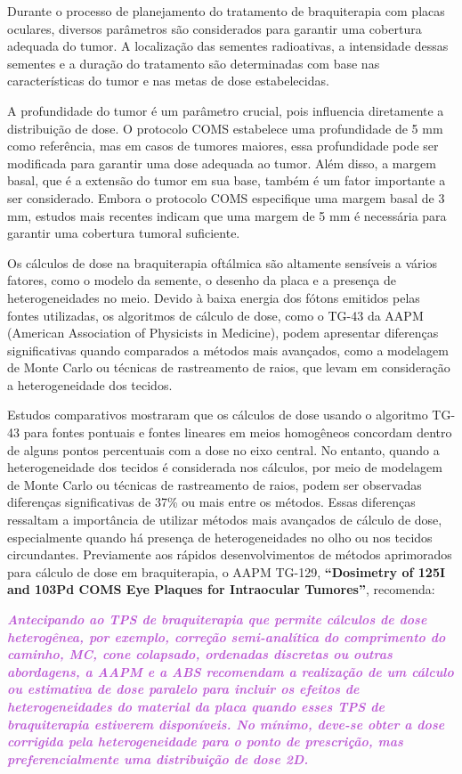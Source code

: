 \documentclass[11pt,a4paper]{article}
\newcounter{exemplo}
\begin{document}
    Durante o processo de planejamento do tratamento de braquiterapia com placas oculares, diversos parâmetros são considerados para garantir uma cobertura adequada do tumor. A localização das sementes radioativas, a intensidade dessas sementes e a duração do tratamento são determinadas com base nas características do tumor e nas metas de dose estabelecidas.

    A profundidade do tumor é um parâmetro crucial, pois influencia diretamente a distribuição de dose. O protocolo COMS estabelece uma profundidade de 5 mm como referência, mas em casos de tumores maiores, essa profundidade pode ser modificada para garantir uma dose adequada ao tumor. Além disso, a margem basal, que é a extensão do tumor em sua base, também é um fator importante a ser considerado. Embora o protocolo COMS especifique uma margem basal de 3 mm, estudos mais recentes indicam que uma margem de 5 mm é necessária para garantir uma cobertura tumoral suficiente.

    Os cálculos de dose na braquiterapia oftálmica são altamente sensíveis a vários fatores, como o modelo da semente, o desenho da placa e a presença de heterogeneidades no meio. Devido à baixa energia dos fótons emitidos pelas fontes utilizadas, os algoritmos de cálculo de dose, como o TG-43 da AAPM (American Association of Physicists in Medicine), podem apresentar diferenças significativas quando comparados a métodos mais avançados, como a modelagem de Monte Carlo ou técnicas de rastreamento de raios, que levam em consideração a heterogeneidade dos tecidos.

    Estudos comparativos mostraram que os cálculos de dose usando o algoritmo TG-43 para fontes pontuais e fontes lineares em meios homogêneos concordam dentro de alguns pontos percentuais com a dose no eixo central. No entanto, quando a heterogeneidade dos tecidos é considerada nos cálculos, por meio de modelagem de Monte Carlo ou técnicas de rastreamento de raios, podem ser observadas diferenças significativas de 37\% ou mais entre os métodos. Essas diferenças ressaltam a importância de utilizar métodos mais avançados de cálculo de dose, especialmente quando há presença de heterogeneidades no olho ou nos tecidos circundantes. Previamente aos rápidos desenvolvimentos de métodos aprimorados para cálculo de dose em braquiterapia, o AAPM TG-129, \textbf{``Dosimetry of 125I and 103Pd COMS Eye Plaques for Intraocular Tumores''}, recomenda:

    \textit{\textbf{\textcolor{MediumOrchid}{Antecipando ao TPS de braquiterapia que permite cálculos de dose heterogênea, por exemplo, correção semi-analítica do comprimento do caminho, MC, cone colapsado, ordenadas discretas ou outras abordagens, a AAPM e a ABS recomendam a realização de um cálculo ou estimativa de dose paralelo para incluir os efeitos de heterogeneidades do material da placa quando esses TPS de braquiterapia estiverem disponíveis. No mínimo, deve-se obter a dose corrigida pela heterogeneidade para o ponto de prescrição, mas preferencialmente uma distribuição de dose 2D.}}}
\end{document}
